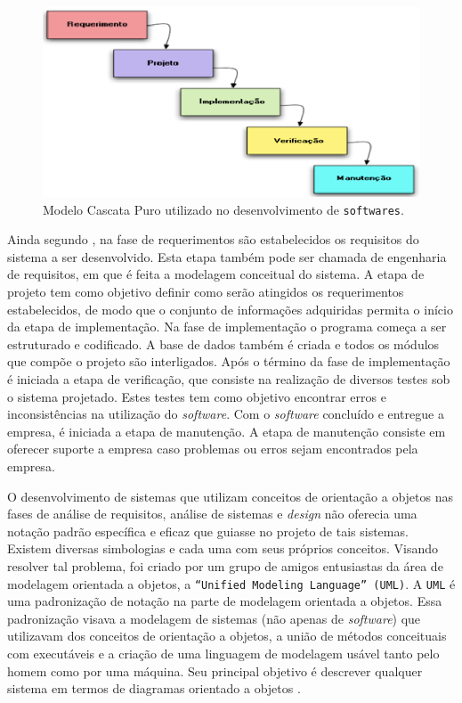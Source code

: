 \begin{figure}[h]
	\centering
	\caption{\label{cascata}Modelo Cascata Puro utilizado no desenvolvimento de \texttt{softwares}.}
		\includegraphics[keepaspectratio=true,scale=1]{figuras/cascata.eps}
\end{figure}

Ainda segundo \cite{cole2011}, na fase de requerimentos são estabelecidos os
requisitos do sistema a ser desenvolvido. Esta etapa também pode ser chamada de engenharia
de requisitos, em que é feita a modelagem conceitual do sistema. A etapa de projeto tem como
objetivo definir como serão atingidos os requerimentos estabelecidos, de modo que o conjunto
de informações adquiridas permita o início da etapa de implementação. Na fase de
implementação o programa começa a ser estruturado e codificado. A base de dados também é
criada e todos os módulos que compõe o projeto são interligados. Após o término da fase de
implementação é iniciada a etapa de verificação, que consiste na realização de diversos testes
sob o sistema projetado. Estes testes tem como objetivo encontrar erros e inconsistências na
utilização do \textit{software}. Com o \textit{software} concluído e entregue a empresa, é iniciada a etapa de
manutenção. A etapa de manutenção consiste em oferecer suporte a empresa caso problemas
ou erros sejam encontrados pela empresa.

O desenvolvimento de sistemas que utilizam conceitos de orientação a objetos nas fases de análise de requisitos,
análise de sistemas e \textit{design} não oferecia uma notação padrão específica e eficaz que guiasse no projeto de tais sistemas.
Existem diversas simbologias e cada uma com seus próprios conceitos. Visando resolver tal problema, foi criado por um grupo 
de amigos entusiastas da área de modelagem orientada a objetos, a \texttt{“Unified Modeling Language” (UML)}. A \texttt{UML} é uma padronização 
de notação na parte de modelagem orientada a objetos. Essa padronização visava a modelagem de sistemas (não apenas de \textit{software}) 
que utilizavam dos conceitos de orientação a objetos, a união de métodos conceituais com executáveis e a criação de uma linguagem 
de modelagem usável tanto pelo homem como por uma máquina. Seu principal objetivo é descrever qualquer sistema em termos de diagramas 
orientado a objetos \cite{uml}.

